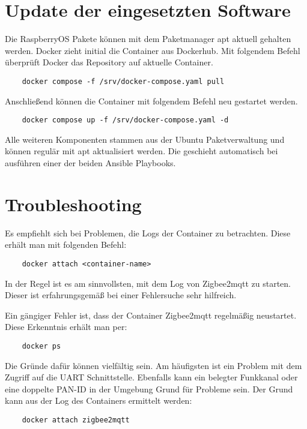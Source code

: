 \section{Update der eingesetzten Software}

Die RaspberryOS Pakete können mit dem Paketmanager apt aktuell gehalten werden. Docker zieht initial die Container aus Dockerhub.
Mit folgendem Befehl überprüft Docker das Repository auf aktuelle Container.

\begin{lstlisting}
    docker compose -f /srv/docker-compose.yaml pull 
\end{lstlisting}

Anschließend können die Container mit folgendem Befehl neu gestartet werden.

\begin{lstlisting}
    docker compose up -f /srv/docker-compose.yaml -d 
\end{lstlisting}

Alle weiteren Komponenten stammen aus der Ubuntu Paketverwaltung und können regulär mit apt aktualisiert werden. Die geschieht automatisch bei ausführen einer der 
beiden Ansible Playbooks.

\section{Troubleshooting}

Es empfiehlt sich bei Problemen, die Logs der Container zu betrachten. Diese erhält man mit folgenden Befehl:

\begin{lstlisting}
    docker attach <container-name>
\end{lstlisting}

In der Regel ist es am sinnvollsten, mit dem Log von Zigbee2mqtt zu starten. Dieser ist erfahrungsgemäß bei einer Fehlersuche sehr hilfreich.

Ein gängiger Fehler ist, dass der Container Zigbee2mqtt regelmäßig neustartet. Diese Erkenntnis erhält man per:
\begin{lstlisting}
    docker ps
\end{lstlisting}
Die Gründe dafür können vielfältig sein. Am häufigsten ist ein Problem mit dem Zugriff auf die UART Schnittstelle. Ebenfalls kann ein belegter Funkkanal
oder eine doppelte PAN-ID in der Umgebung Grund für Probleme sein. 
Der Grund kann aus der Log des Containers ermittelt werden:
\begin{lstlisting}
    docker attach zigbee2mqtt
\end{lstlisting}



